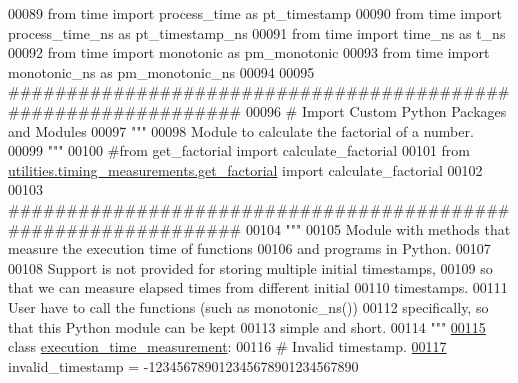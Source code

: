 \begin{DoxyCode}
00089 \textcolor{keyword}{from} time \textcolor{keyword}{import} process\_time \textcolor{keyword}{as} pt\_timestamp
00090 \textcolor{keyword}{from} time \textcolor{keyword}{import} process\_time\_ns \textcolor{keyword}{as} pt\_timestamp\_ns
00091 \textcolor{keyword}{from} time \textcolor{keyword}{import} time\_ns \textcolor{keyword}{as} t\_ns
00092 \textcolor{keyword}{from} time \textcolor{keyword}{import} monotonic \textcolor{keyword}{as} pm\_monotonic
00093 \textcolor{keyword}{from} time \textcolor{keyword}{import} monotonic\_ns \textcolor{keyword}{as} pm\_monotonic\_ns
00094 
00095 \textcolor{comment}{###############################################################}
00096 \textcolor{comment}{#   Import Custom Python Packages and Modules}
00097 \textcolor{stringliteral}{"""}
00098 \textcolor{stringliteral}{    Module to calculate the factorial of a number.}
00099 \textcolor{stringliteral}{"""}
00100 \textcolor{comment}{#from get\_factorial import calculate\_factorial}
00101 \textcolor{keyword}{from} \hyperlink{namespaceutilities_1_1timing__measurements_1_1get__factorial}{utilities.timing\_measurements.get\_factorial} \textcolor{keyword}{import} 
      calculate\_factorial
00102 
00103 \textcolor{comment}{###############################################################}
00104 \textcolor{stringliteral}{"""}
00105 \textcolor{stringliteral}{    Module with methods that measure the execution time of functions}
00106 \textcolor{stringliteral}{        and programs in Python.}
00107 \textcolor{stringliteral}{}
00108 \textcolor{stringliteral}{    Support is not provided for storing multiple initial timestamps,}
00109 \textcolor{stringliteral}{        so that we can measure elapsed times from different initial}
00110 \textcolor{stringliteral}{        timestamps.}
00111 \textcolor{stringliteral}{        User have to call the functions (such as monotonic\_ns())}
00112 \textcolor{stringliteral}{            specifically, so that this Python module can be kept}
00113 \textcolor{stringliteral}{            simple and short.}
00114 \textcolor{stringliteral}{"""}
\hypertarget{performance__measurement_8py_source_l00115}{}\hyperlink{classutilities_1_1timing__measurements_1_1performance__measurement_1_1execution__time__measurement}{00115} \textcolor{keyword}{class }\hyperlink{classutilities_1_1timing__measurements_1_1performance__measurement_1_1execution__time__measurement}{execution\_time\_measurement}:
00116     \textcolor{comment}{# Invalid timestamp.}
\hypertarget{performance__measurement_8py_source_l00117}{}\hyperlink{classutilities_1_1timing__measurements_1_1performance__measurement_1_1execution__time__measurement_a3d083e8440c081f0a39ecea850d3cb67}{00117}     invalid\_timestamp = -123456789012345678901234567890

\end{DoxyCode}
